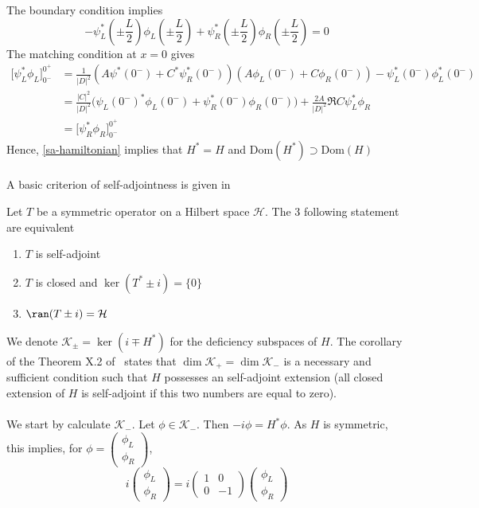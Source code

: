 The boundary condition implies
\begin{equation*}
- \psi_L^*(\pm \frac{L}{2}) \phi_L(\pm \frac{L}{2}) + \psi_R^*(\pm \frac{L}{2}) \phi_R(\pm \frac{L}{2}) =0
\end{equation*}
The matching condition at $x = 0$ gives
\begin{equation*}
\begin{split}
\big[ \psi^*_L\phi_L] ^{0^+}_{0^-} & = \frac{1}{|D|^2}(A \psi^*(0^-) + C^*\psi^*_R(0^-))(A \phi_L(0^-) + C\phi_R(0^-)) - \psi^*_L(0^-)\phi^*_L(0^-) \\
& = \frac{|C|^2}{|D|^2}\big(\psi_L(0^-)^*\phi_L(0^-) + \psi_R^*(0^-) \phi_R(0^-)\big) +
\frac{2A}{|D|^2}\Re{C\psi_L^* \phi_R} \\
& = \big[ \psi^*_R\phi_R] ^{0^+}_{0^-}
\end{split}
\end{equation*}
Hence, \cref{sa-hamiltonian} implies that $H^* = H$ and $\mathrm{Dom}(H^*) \supset \mathrm{Dom}(H)$ 
\\\\
A basic criterion of self-adjointness is given in~\cite{Reed1981}
\begin{theorem}
Let $T$ be a symmetric operator on a Hilbert space $ \mathcal{H}$. The 3 following statement are equivalent 
\begin{enumerate}
\item $T$ is self-adjoint
\item $T$ is closed and $\ker(T^* \pm i) = \{0\}$
\item $\ran(T \pm i ) = \mathcal{H}$
\end{enumerate} 
\end{theorem}
We denote  $\mathcal{K}_{\pm} = \ker (i \mp H^*)$ for the deficiency subspaces of $H$. The corollary of the Theorem X.2 of~\cite{Reed1975} states that $\dim \mathcal{K}_+ = \dim \mathcal{K}_-$ is a necessary and sufficient condition such that $H$ possesses an self-adjoint extension (all closed extension of $H$ is self-adjoint if this two numbers are equal to zero). \\\\
We start by calculate $\mathcal{K}_-$. Let $\phi \in \mathcal{K}_-$. Then $- i \phi = H^* \phi$. As $H$ is symmetric, this implies, for $\phi = \begin{pmatrix} \phi_L \\  \phi_R \end{pmatrix}$, 
\begin{equation}
i \begin{pmatrix} \phi_L \\ \phi_R \end{pmatrix} = 
i \begin{pmatrix} 1 & 0  \\ 0  &  -1 \end{pmatrix} 
\begin{pmatrix}  \phi_L  \\  \phi_R \end{pmatrix}
\end{equation} 
